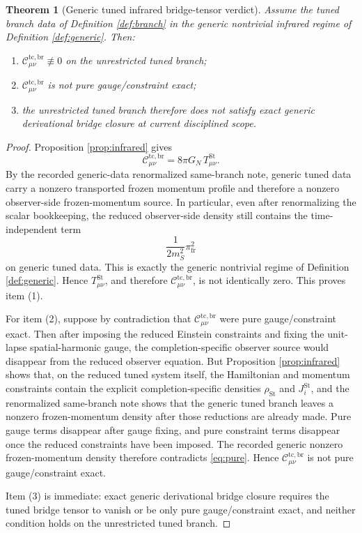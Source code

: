 \documentclass[11pt]{article}
\newtheorem{theorem}{Theorem}
\begin{document}
\begin{theorem}[Generic tuned infrared bridge-tensor verdict]
\label{thm:verdict}
Assume the tuned branch data of Definition \ref{def:branch} in the generic nontrivial infrared regime of Definition \ref{def:generic}. Then:
\begin{enumerate}
    \item \(\mathcal C_{\mu\nu}^{\mathrm{tc,br}}\not\equiv 0\) on the unrestricted tuned branch;
    \item \(\mathcal C_{\mu\nu}^{\mathrm{tc,br}}\) is not pure gauge/constraint exact;
    \item the unrestricted tuned branch therefore does not satisfy exact generic derivational bridge closure at current disciplined scope.
\end{enumerate}
\end{theorem}

\begin{proof}
Proposition \ref{prop:infrared} gives
\[
\mathcal C_{\mu\nu}^{\mathrm{tc,br}}
=
8\pi G_N\,T_{\mu\nu}^{\mathrm{St}}.
\]
By the recorded generic-data renormalized same-branch note, generic tuned data carry a nonzero transported frozen momentum profile and therefore a nonzero observer-side frozen-momentum source. In particular, even after renormalizing the scalar bookkeeping, the reduced observer-side density still contains the time-independent term
\[
\frac{1}{2m_S^2}\pi_{\mathrm{fr}}^2
\]
on generic tuned data. This is exactly the generic nontrivial regime of Definition \ref{def:generic}. Hence \(T_{\mu\nu}^{\mathrm{St}}\), and therefore \(\mathcal C_{\mu\nu}^{\mathrm{tc,br}}\), is not identically zero. This proves item (1).

For item (2), suppose by contradiction that \(\mathcal C_{\mu\nu}^{\mathrm{tc,br}}\) were pure gauge/constraint exact. Then after imposing the reduced Einstein constraints and fixing the unit-lapse spatial-harmonic gauge, the completion-specific observer source would disappear from the reduced observer equation. But Proposition \ref{prop:infrared} shows that, on the reduced tuned system itself, the Hamiltonian and momentum constraints contain the explicit completion-specific densities \(\rho_{\mathrm{St}}\) and \(J_i^{\mathrm{St}}\), and the renormalized same-branch note shows that the generic tuned branch leaves a nonzero frozen-momentum density after those reductions are already made. Pure gauge terms disappear after gauge fixing, and pure constraint terms disappear once the reduced constraints have been imposed. The recorded generic nonzero frozen-momentum density therefore contradicts \eqref{eq:pure}. Hence \(\mathcal C_{\mu\nu}^{\mathrm{tc,br}}\) is not pure gauge/constraint exact.

Item (3) is immediate: exact generic derivational bridge closure requires the tuned bridge tensor to vanish or be only pure gauge/constraint exact, and neither condition holds on the unrestricted tuned branch.
\end{proof}
\end{document}
